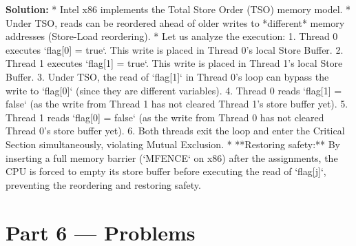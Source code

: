 \documentclass[12pt, a4paper]{book}
\begin{document}
\begin{problembox}
\begin{enumerate}[label=\textbf{E\arabic*.}]
        \textbf{Solution:}
        * Intel x86 implements the Total Store Order (TSO) memory model.
        * Under TSO, reads can be reordered ahead of older writes to *different* memory addresses (Store-Load reordering).
        * Let us analyze the execution:
          1. Thread 0 executes `flag[0] = true`. This write is placed in Thread 0's local Store Buffer.
          2. Thread 1 executes `flag[1] = true`. This write is placed in Thread 1's local Store Buffer.
          3. Under TSO, the read of `flag[1]` in Thread 0's loop can bypass the write to `flag[0]` (since they are different variables).
          4. Thread 0 reads `flag[1] = false` (as the write from Thread 1 has not cleared Thread 1's store buffer yet).
          5. Thread 1 reads `flag[0] = false` (as the write from Thread 0 has not cleared Thread 0's store buffer yet).
          6. Both threads exit the loop and enter the Critical Section simultaneously, violating Mutual Exclusion.
        * **Restoring safety:** By inserting a full memory barrier (`MFENCE` on x86) after the assignments, the CPU is forced to empty its store buffer before executing the read of `flag[j]`, preventing the reordering and restoring safety.
\end{enumerate}
\end{problembox}

\newpage

\section{Part 6 --- Problems}
\end{document}

